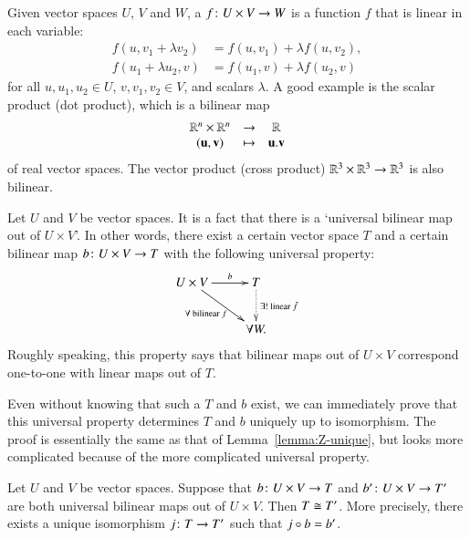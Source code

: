 \begin{iexample}
\label{eg:univ-tensor}
Given vector%
%
%
spaces $U$, $V$ and $W$, a  $f\from U \times V \to W$ is a function $f$ that is linear in each
variable:
%
\begin{align*}
f(u, v_1 + \lambda v_2)         &=
f(u, v_1) + \lambda f(u, v_2),  \\
f(u_1 + \lambda u_2, v)         &=
f(u_1, v) + \lambda f(u_2, v)
\end{align*}
%
for all $u, u_1, u_2 \in U$, $v, v_1, v_2 \in V$, and scalars $\lambda$.  A
good example is the scalar product (dot product), which is a bilinear map
\[
\begin{array}{ccc}
\mathbb{R}^n \times \mathbb{R}^n        &\to            &\mathbb{R}                 \\
(\mathbf{u}, \mathbf{v})        &\mapsto        &\mathbf{u}.\mathbf{v}
\end{array}
\]
of real vector spaces.  The vector product (cross product) $\mathbb{R}^3 \times
\mathbb{R}^3 \to \mathbb{R}^3$ is also bilinear.

Let $U$ and $V$ be vector spaces.  It is a fact that there is a `universal
bilinear map out of $U \times V$'.  In other words, there exist a certain
vector space $T$%
%
%
and a certain bilinear map $b\from U \times V \to T$ with the following
universal property:
%
\begin{equation}
\label{eq:univ-tensor}
\begin{array}{c}
\xymatrix{
U \times V \ar[r]^-b \ar[dr]_{\forall \text{ bilinear } f} &
T \ar@{.>}[d]^{\exists! \text{ linear } \bar{f}}     \\
&
\forall W.
}
\end{array}
\end{equation}
%
Roughly speaking, this property says that bilinear maps out of $U \times V$
correspond one-to-one with linear maps out of $T$.

Even without knowing that such a $T$ and $b$ exist, we can immediately
prove that this universal property determines $T$ and $b$ uniquely up to
isomorphism.  The proof is essentially the same as that of
Lemma~\ref{lemma:Z-unique}, but looks more complicated because of the more
complicated universal property.
\end{iexample}

\begin{ilemma}
\label{lemma:tensor-unique}
%
%
Let $U$ and $V$ be vector spaces.  Suppose that $b\from U \times V \to T$
and $b'\from U \times V \to T'$ are both universal bilinear maps out of $U
\times V$.  Then $T \cong T'$.  More precisely, there exists a unique
isomorphism $j\from T \to T'$ such that $j \mathbin{\circ} b = b'$.
\end{ilemma}

